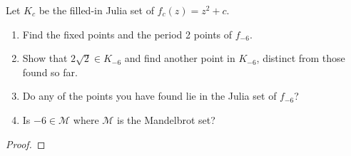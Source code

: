 \begin{problem}{2}
  Let $K_c$ be the filled-in Julia set of $f_c(z) = z^2+c$.
  \begin{enumerate}
    \item Find the fixed points and the period 2 points of $f_{-6}$.
    \item Show that $2\sqrt{2} \in K_{-6}$ and find another point in $K_{-6}$,
      distinct from those found so far.
    \item Do any of the points you have found lie in the Julia set of $f_{-6}$?
    \item Is $-6\in\mathcal{M}$ where $\mathcal{M}$ is the Mandelbrot set?
  \end{enumerate}
\end{problem}

\begin{proof}
\end{proof}
\newpage
